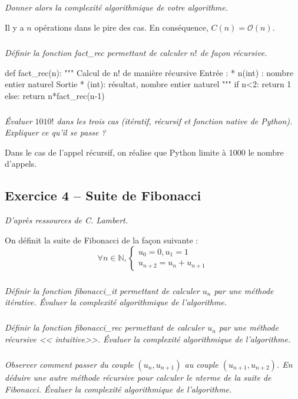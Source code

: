 \documentclass[10pt,fleqn]{article} %
\begin{document}
\begin{multicols}{2}
\subparagraph{}
\textit{Donner alors la complexité algorithmique de votre algorithme.}
\ifprof
\begin{corrige}
Il y a $n$ opérations dans le pire des cas. En conséquence, $C(n)=\mathcal{O}(n)$.
\end{corrige}
\else
\fi

\subparagraph{}
\textit{Définir la fonction \textsl{fact\_rec} permettant de calculer $n!$ de façon récursive.}
\ifprof
\begin{corrige}
\begin{python}
def fact_rec(n):
    """
    Calcul de n! de manière récursive
    Entrée : 
     * n(int) : nombre entier naturel
    Sortie 
     * (int): résultat, nombre entier naturel
    """
    if n<2:
        return 1
    else:
        return n*fact_rec(n-1)
\end{python}
\end{corrige}
\else
\fi


\subparagraph{}
\textit{Évaluer $1010!$ dans les trois cas (itératif, récursif et fonction native de Python). Expliquer ce qu'il se passe ?}
\ifprof
\begin{corrige}
Dans le cas de l'appel récursif, on réalise que Python limite à 1000 le nombre d'appels. 
\end{corrige}
\else
\fi

\subsection*{Exercice 4 -- Suite de Fibonacci}
\textit{D'après ressources de C. Lambert.}

\setcounter{subparagraph}{0}
On définit la suite de Fibonacci de la façon suivante : 
$$
\forall n\in \mathbb{N}, \left\{ \begin{array}{l}
u_0 = 0, u_1 = 1 \\
u_{n+2} = u_{n} + u_{n+1}
\end{array}\right.
$$

\subparagraph{}
\textit{Définir la fonction \textsl{fibonacci\_it} permettant de calculer $u_n$ par une méthode itérative. Évaluer la complexité algorithmique de l'algorithme.}

\subparagraph{}
\textit{Définir la fonction \textsl{fibonacci\_rec} permettant de calculer $u_n$ par une méthode récursive << intuitive>>. Évaluer la complexité algorithmique de l'algorithme.}


\subparagraph{}
\textit{Observer comment passer du couple $(u_n,u_{n+1})$ au couple $(u_{n+1},u_{n+2})$. En déduire une autre méthode récursive pour calculer le n\ieme terme de la suite de Fibonacci. Évaluer la complexité algorithmique de l'algorithme.}


\end{multicols}
\end{document}
